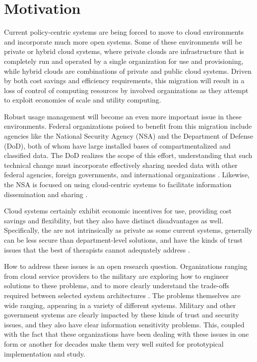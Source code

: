 \documentclass{acm_proc_article-sp}
\begin{document}
\section{Motivation}\label{sec:motivation}
Current policy-centric systems are being forced to move to cloud environments and incorporate much more open systems.  Some of these environments will be private or hybrid cloud systems, where private clouds are infrastructure that is completely run and operated by a single organization for use and provisioning, while hybrid clouds are combinations of private and public cloud systems.  Driven by both cost savings and efficiency requirements, this migration will result in a loss of control of computing resources by involved organizations as they attempt to exploit economies of scale and utility computing.

Robust usage management will become an even more important issue in these environments.  Federal organizations poised to benefit from this migration include agencies like the National Security Agency (NSA) and the Department of Defense (DoD), both of whom have large installed bases of compartmentalized and classified data.  The DoD realizes the scope of this effort, understanding that such technical change must incorporate effectively sharing needed data with other federal agencies, foreign governments, and international organizations \cite{proposal:info-sharing-strategy}.  Likewise, the NSA is focused on using cloud-centric systems to facilitate information dissemination and sharing \cite{proposal:nsa-cloud}.

Cloud systems certainly exhibit economic incentives for use, providing cost savings and flexibility, but they also have distinct disadvantages as well.  Specifically, the are not intrinsically as private as some current systems, generally can be less secure than department-level solutions, and have the kinds of trust issues that the best of therapists cannot adequately address \cite{proposal:privacy-security-trust-cloud}.

How to address these issues is an open research question.  Organizations ranging from cloud service providers to the military are exploring how to engineer solutions to these problems, and to more clearly understand the trade-offs required between selected system architectures \cite{proposal:assured-info-sharing}.  The problems themselves are wide ranging, appearing in a variety of different systems.  Military and other government systems are clearly impacted by these kinds of trust and security issues, and they also have clear information sensitivity problems.  This, coupled with the fact that these organizations have been dealing with these issues in one form or another for decades make them very well suited for prototypical implementation and study.
\end{document}
